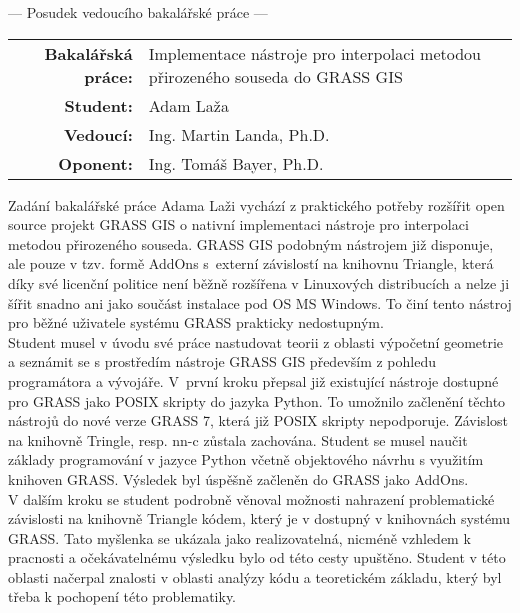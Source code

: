 \documentclass[czech,11pt,a4paper]{article}
\begin{document}
\begin{center}
  {\Large --- Posudek vedoucího bakalářské práce ---}
\end{center}

\vspace{.2cm}

\noindent \begin{tabular}{rp{}}
  {\bf Bakalářská práce:} & Implementace nástroje pro interpolaci metodou přirozeného souseda do GRASS GIS \\
  {\bf Student:} & Adam Laža \\
  {\bf Vedoucí:} & Ing. Martin Landa, Ph.D. \\
  {\bf Oponent:} & Ing. Tomáš Bayer, Ph.D. \\
\end{tabular}

\vspace{1cm}

Zadání bakalářské práce Adama Laži vychází z praktického potřeby
rozšířit open source projekt GRASS GIS o nativní implementaci nástroje
pro interpolaci metodou přirozeného souseda. GRASS GIS podobným
nástrojem již disponuje, ale pouze v tzv. formě AddOns s~externí
závislostí na knihovnu Triangle, která díky své licenční politice není
běžně rozšířena v Linuxových distribucích a nelze ji šířit snadno ani
jako součást instalace pod OS MS Windows. To činí tento nástroj pro
běžné uživatele systému GRASS prakticky nedostupným.
\\

Student musel v úvodu své práce nastudovat teorii z oblasti výpočetní
geometrie a seznámit se s prostředím nástroje GRASS GIS především z
pohledu programátora a vývojáře. V~první kroku přepsal již existující
nástroje dostupné pro GRASS jako POSIX skripty do jazyka Python. To
umožnilo začlenění těchto nástrojů do nové verze GRASS 7, která již
POSIX skripty nepodporuje. Závislost na knihovně Tringle, resp. nn-c
zůstala zachována. Student se musel naučit základy programování v
jazyce Python včetně objektového návrhu s využitím knihoven
GRASS. Výsledek byl úspěšně začleněn do GRASS jako AddOns.
\\

V dalším kroku se student podrobně věnoval možnosti nahrazení
problematické závislosti na knihovně Triangle kódem, který je v
dostupný v knihovnách systému GRASS. Tato myšlenka se ukázala jako
realizovatelná, nicméně vzhledem k pracnosti a očekávatelnému výsledku
bylo od této cesty upuštěno. Student v této oblasti načerpal znalosti
v oblasti analýzy kódu a teoretickém základu, který byl třeba k
pochopení této problematiky.
\\
\end{document}
